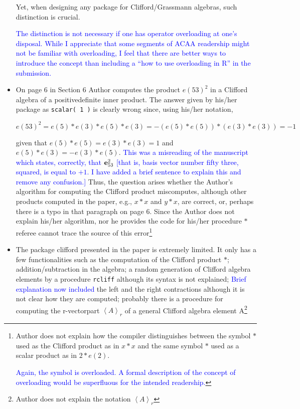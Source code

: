 \documentclass{article}
\newcommand{\ei}[1]{\ensuremath{{\bf e}_{#1}}}
\begin{document}
\begin{itemize}
  Yet, when designing any package for Clifford/Grassmann algebras,
  such distinction is crucial.

  \textcolor{blue}{The distinction is not necessary if one has
    operator overloading at one's disposal.  While I appreciate that
    some segments of ACAA readership might not be familiar with
    overloading, I feel that there are better ways to introduce the
    concept than including a ``how to use overloading in R'' in the
    submission.}

\item On page 6 in Section 6 Author computes the product $e(53)^2$ in
  a Clifford algebra of a positivedefinite inner product. The answer
  given by his/her package as \verb+scalar( 1 )+ is clearly wrong
  since, using his/her notation,

  $$
  e(53)^2=e(5)*e(3)*e(5)*e(3)=-(e(5)*e(5))*(e(3)*e(3))=-1
  $$

  given that $e(5)*e(5)=e(3)*e(3)=1$ and $e(5)*e(3)=-e(3)*e(5)$.
  \textcolor{blue}{This was a misreading of the manuscript which
    states, correctly, that $\ei{53}^2$ [that is, basis vector number
      fifty three, squared, is equal to $+1$.  I have added a brief
      sentence to explain this and remove any confusion.]}
   Thus,
the question arises whether the Author’s algorithm for computing the
Clifford product miscomputes, although other products computed in the
paper, e.g., $x * x$ and $y * x$, are correct, or, perhaps there is a
typo in that paragraph on page 6.  Since the Author does not explain
his/her algorithm, nor he provides the code for his/her procedure $*$
referee cannot trace the source of this error\footnote{Author does not
explain how the compiler distinguishes between the symbol $*$ used as
the Clifford product as in $x * x$ and the same symbol $*$ used as a
scalar product as in $2 * e(2)$.

\textcolor{blue}{Again, the {\tt *} symbol is overloaded.  A formal
  description of the concept of overloading would be superfluous for
  the intended readership.}  }

\item The package clifford presented in the paper is extremely
  limited. It only has a few functionalities such as the computation
  of the Clifford product $*$; addition/subtraction in the algebra; a
  random generation of Clifford algebra elements by a procedure
  \verb+rcliff+ although its syntax is not explained;
  \textcolor{blue}{Brief explanation now included} the left and the
  right contractions although it is not clear how they are computed;
  probably there is a procedure for computing the r-vectorpart
  $\left\langle A\right\rangle_r$ of a general Clifford algebra
  element A\footnote{ Author does not explain the notation
  $\left\langle A\right\rangle_r$

}
\end{itemize}
\end{document}
